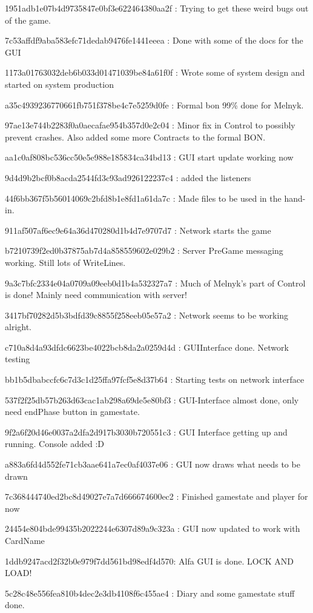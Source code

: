 1951adb1e07b4d9735847e0bf3e622464380aa2f : Trying to get these weird bugs out of the game.

7c53affdf9aba583efc71dedab9476fe1441eeea : Done with some of the docs for the GUI

1173a01763032deb6b033d01471039be84a61f0f : Wrote some of system design and started on system production

a35c4939236770661fb751f378be4c7e5259d0fe : Formal bon 99\% done for Melnyk.

97ae13e744b2283f0a0aecafae954b357d0e2c04 : Minor fix in Control to possibly prevent crashes. Also added some more Contracts to the formal BON.

aa1c0af808bc536cc50e5e988e185834ca34bd13 : GUI start update working now

9d4d9b2bcf0b8acda2544fd3c93ad926122237c4 : added the listeners

44f6bb367f5b56014069c2bfd8b1e8fd1a61da7c : Made files to be used in the hand-in.

911af507af6ec9e64a36d470280d1b4d7e9707d7 : Network starts the game

b7210739f2ed0b37875ab7d4a858559602e029b2 : Server PreGame messaging working. Still lots of WriteLines.

9a3c7bfc2334e04a0709a09eeb0d1b4a532327a7 : Much of Melnyk's part of Control is done! Mainly need communication with server!

3417bf70282d5b3bdfd39c8855f258eeb05e57a2 : Network seems to be working alright.

c710a8d4a93dfdc6623be4022bcb8da2a0259d4d : GUIInterface done. Network testing

bb1b5dbabccfc6c7d3c1d25ffa97fcf5e8d37b64 : Starting tests on network interface

537f2f25db57b263d63cac1ab298a69de5e80bf3 : GUI-Interface almost done, only need endPhase button in gamestate.

9f2a6f20d46e0037a2dfa2d917b3030b720551c3 : GUI Interface getting up and running. Console added :D

a883a6fd4d552fe71cb3aae641a7ec0af4037e06 : GUI now draws what needs to be drawn

7c368444740ed2bc8d49027e7a7d666674600ec2 : Finished gamestate and player for now

24454e804bde99435b2022244e6307d89a9c323a : GUI now updated to work with CardName

1ddb9247acd2f32b0e979f7dd561bd98edf4d570: Alfa GUI is done. LOCK AND LOAD!

5c28c48e556fea810b4dec2e3db4108f6c455ae4 : Diary and some gamestate stuff done.

